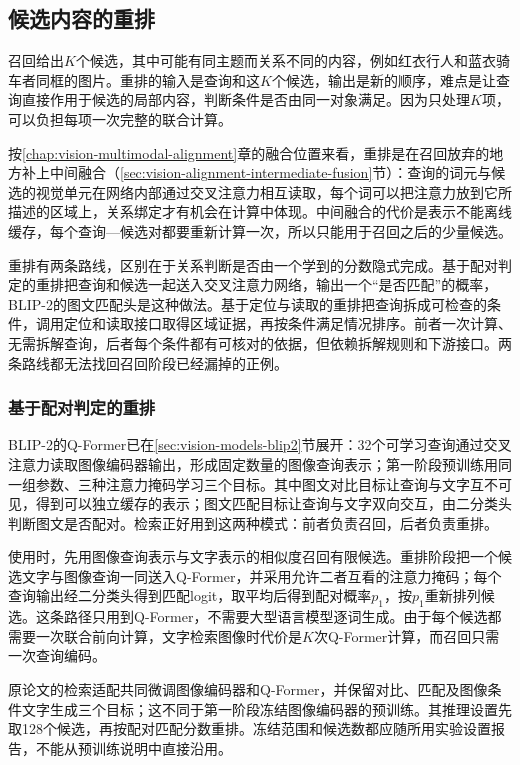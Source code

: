 \subsection{候选内容的重排}
\label{sec:vision-understanding-reranking}

召回给出$K$个候选，其中可能有同主题而关系不同的内容，例如红衣行人和蓝衣骑车者同框的图片。重排的输入是查询和这$K$个候选，输出是新的顺序，难点是让查询直接作用于候选的局部内容，判断条件是否由同一对象满足。因为只处理$K$项，可以负担每项一次完整的联合计算。

按\ref{chap:vision-multimodal-alignment}章的融合位置来看，重排是在召回放弃的地方补上中间融合（\ref{sec:vision-alignment-intermediate-fusion}节）：查询的词元与候选的视觉单元在网络内部通过交叉注意力相互读取，每个词可以把注意力放到它所描述的区域上，关系绑定才有机会在计算中体现。中间融合的代价是表示不能离线缓存，每个查询—候选对都要重新计算一次，所以只能用于召回之后的少量候选。

重排有两条路线，区别在于关系判断是否由一个学到的分数隐式完成。基于配对判定的重排把查询和候选一起送入交叉注意力网络，输出一个“是否匹配”的概率，BLIP-2的图文匹配头是这种做法。基于定位与读取的重排把查询拆成可检查的条件，调用定位和读取接口取得区域证据，再按条件满足情况排序。前者一次计算、无需拆解查询，后者每个条件都有可核对的依据，但依赖拆解规则和下游接口。两条路线都无法找回召回阶段已经漏掉的正例。

\subsubsection{基于配对判定的重排}
\label{sec:vision-understanding-blip-retrieval}

BLIP-2的Q-Former已在\ref{sec:vision-models-blip2}节展开：32个可学习查询通过交叉注意力读取图像编码器输出，形成固定数量的图像查询表示；第一阶段预训练用同一组参数、三种注意力掩码学习三个目标。其中图文对比目标让查询与文字互不可见，得到可以独立缓存的表示；图文匹配目标让查询与文字双向交互，由二分类头判断图文是否配对。检索正好用到这两种模式：前者负责召回，后者负责重排。

使用时，先用图像查询表示与文字表示的相似度召回有限候选。重排阶段把一个候选文字与图像查询一同送入Q-Former，并采用允许二者互看的注意力掩码；每个查询输出经二分类头得到匹配logit，取平均后得到配对概率$p_1$，按$p_1$重新排列候选。这条路径只用到Q-Former，不需要大型语言模型逐词生成。由于每个候选都需要一次联合前向计算，文字检索图像时代价是$K$次Q-Former计算，而召回只需一次查询编码。

原论文的检索适配共同微调图像编码器和Q-Former，并保留对比、匹配及图像条件文字生成三个目标；这不同于第一阶段冻结图像编码器的预训练。其推理设置先取128个候选，再按配对匹配分数重排。冻结范围和候选数都应随所用实验设置报告，不能从预训练说明中直接沿用。

